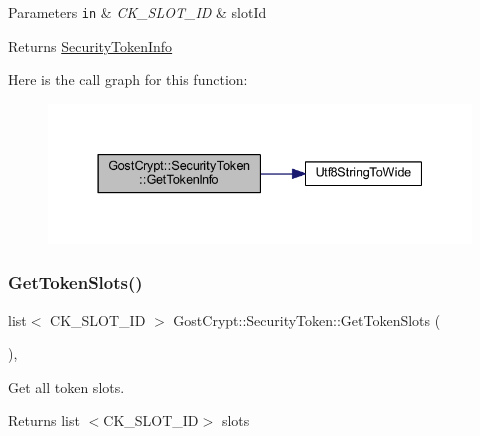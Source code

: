 \begin{DoxyParams}[1]{Parameters}
\mbox{\tt in}  & {\em C\+K\+\_\+\+S\+L\+O\+T\+\_\+\+ID} & slot\+Id \\
\hline
\end{DoxyParams}
\begin{DoxyReturn}{Returns}
\hyperlink{struct_gost_crypt_1_1_security_token_info}{Security\+Token\+Info} 
\end{DoxyReturn}
Here is the call graph for this function\+:
\nopagebreak
\begin{figure}[H]
\begin{center}
\leavevmode
\includegraphics[width=337pt]{class_gost_crypt_1_1_security_token_a61ed08d98ce1809e0a4e917ee4b07563_cgraph}
\end{center}
\end{figure}
\mbox{\label{class_gost_crypt_1_1_security_token_a44e6be1a8c3ddad54acbe4a76488d0f7}} 
\subsubsection{\texorpdfstring{Get\+Token\+Slots()}{GetTokenSlots()}}
{\footnotesize\ttfamily list$<$ C\+K\+\_\+\+S\+L\+O\+T\+\_\+\+ID $>$ Gost\+Crypt\+::\+Security\+Token\+::\+Get\+Token\+Slots (\begin{DoxyParamCaption}{ }\end{DoxyParamCaption})\hspace{0.3cm}{\ttfamily [static]}, {\ttfamily [protected]}}



Get all token slots. 

\begin{DoxyReturn}{Returns}
list $<$\+C\+K\+\_\+\+S\+L\+O\+T\+\_\+\+I\+D$>$ slots 
\end{DoxyReturn}
\mbox{\label{class_gost_crypt_1_1_security_token_a49a6110830e19cf95cecdf554a6ca449}} 
